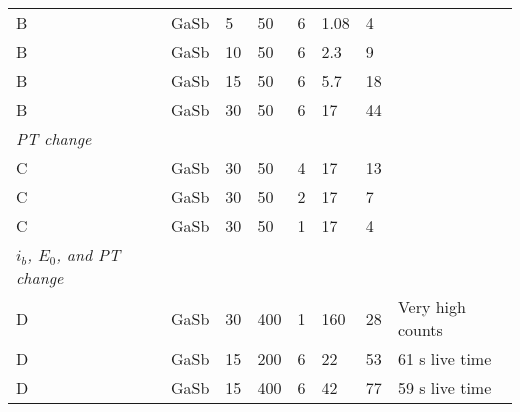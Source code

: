 \begin{table}[phtb]
\begin{center}
\begin{tabular}{lllllllp{3.5cm}}
            B                                  & GaSb            & 5              & 50             & 6           & 1.08         & 4           &                     \\
            B                                  & GaSb            & 10             & 50             & 6           & 2.3          & 9           &                     \\
            B                                  & GaSb            & 15             & 50             & 6           & 5.7          & 18          &                     \\
            B                                  & GaSb            & 30             & 50             & 6           & 17           & 44          &                     \\
            \hline
            \emph{PT change}                   &                 &                &                &             &              &             &                     \\
            C                                  & GaSb            & 30             & 50             & 4           & 17           & 13          &                     \\
            C                                  & GaSb            & 30             & 50             & 2           & 17           & 7           &                     \\
            C                                  & GaSb            & 30             & 50             & 1           & 17           & 4           &                     \\
            \hline
            \emph{$i_b$, $E_0$, and PT change} &                 &                &                &             &              &             &                     \\
            D                                  & GaSb            & 30             & 400            & 1           & 160          & 28          & Very high counts    \\
            D                                  & GaSb            & 15             & 200            & 6           & 22           & 53          & 61 s live time      \\
            D                                  & GaSb            & 15             & 400            & 6           & 42           & 77          & 59 s live time      \\

\end{tabular}
\end{center}
\end{table}
